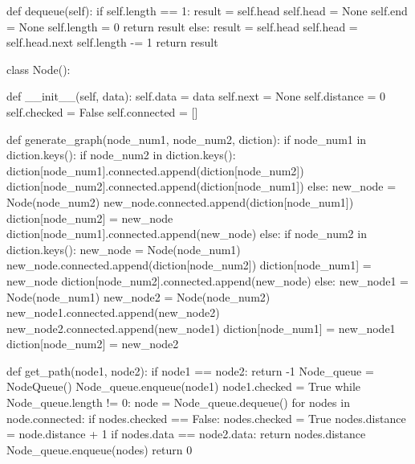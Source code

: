 \documentclass{assignment-263}
\begin{document}
\begin{enumerate}
\begin{python}
      
      def dequeue(self):
            if self.length == 1:
                  result = self.head
                  self.head = None
                  self.end = None
                  self.length = 0
                  return result
            else:
                  result = self.head
                  self.head = self.head.next
                  self.length -= 1
                  return result



class Node():
  
      def __init__(self, data):
            self.data =  data
            self.next = None
            self.distance = 0
            self.checked = False
            self.connected = [] 



def generate_graph(node_num1, node_num2, diction):
      if node_num1 in diction.keys():
            if node_num2 in diction.keys():
                  diction[node_num1].connected.append(diction[node_num2])
                  diction[node_num2].connected.append(diction[node_num1])
            else:
                  new_node = Node(node_num2)
                  new_node.connected.append(diction[node_num1])
                  diction[node_num2] = new_node
                  diction[node_num1].connected.append(new_node)
      else:
            if node_num2 in diction.keys():
                  new_node = Node(node_num1)
                  new_node.connected.append(diction[node_num2])
                  diction[node_num1] = new_node
                  diction[node_num2].connected.append(new_node)
            else:
                  new_node1 = Node(node_num1)
                  new_node2 = Node(node_num2)
                  new_node1.connected.append(new_node2)
                  new_node2.connected.append(new_node1)
                  diction[node_num1] = new_node1
                  diction[node_num2] = new_node2



def get_path(node1, node2):
      if node1 == node2:
            return -1
      Node_queue = NodeQueue()
      Node_queue.enqueue(node1)
      node1.checked = True
      while Node_queue.length != 0:
            node = Node_queue.dequeue()
            for nodes in node.connected:
                  if nodes.checked == False:
                        nodes.checked = True
                        nodes.distance = node.distance + 1
                        if nodes.data == node2.data:
                              return nodes.distance
                        Node_queue.enqueue(nodes)
      return 0
     

\end{python}
\end{enumerate}
\end{document}
